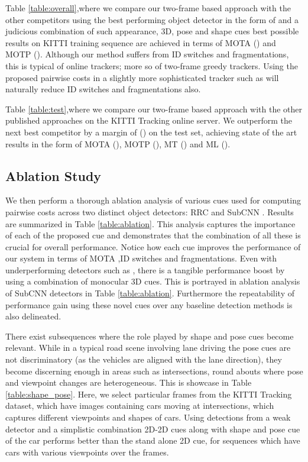 \documentclass[letterpaper, 10 pt, conference]{ieeeconf}
\begin{document}
Table \ref{table:overall},where we compare our two-frame based approach with the other competitors using the best performing object detector in the form of \cite{RRC} and a judicious combination of such appearance, 3D, pose and shape cues best possible results on KITTI training sequence are achieved in terms of MOTA () and MOTP (). Although our method suffers from ID switches and fragmentations, this is typical of online trackers; more so of two-frame greedy trackers. Using the proposed pairwise costs in a slightly more sophisticated tracker such as \cite{NOMT,followme} will naturally reduce ID switches and fragmentations also.

Table \ref{table:test},where we compare our two-frame based approach with the other published approaches on the KITTI Tracking online server. We outperform the next best competitor by a margin of () on the test set, achieving state of the art results in the form of MOTA (), MOTP (), MT () and ML ().

\subsection{Ablation Study}

We then perform a thorough ablation analysis of various cues used for computing pairwise costs across two distinct object detectors: RRC \cite{RRC} and SubCNN \cite{SubCNN}. 
Results are summarized in Table \ref{table:ablation}. This analysis captures the importance of each of the proposed cue and demonstrates that the combination of all these is crucial for overall performance. Notice how each cue improves the performance of our system in terms of MOTA ,ID switches and fragmentations. Even with underperforming detectors such as \cite{SubCNN}, there is a tangible performance boost by using a combination of monocular 3D cues. This is portrayed in ablation analysis of SubCNN detectors in Table \ref{table:ablation}. Furthermore the repeatability of performance gain using these novel cues over any baseline detection methods is also delineated.

There exist subsequences where the role played by shape and pose cues become relevant. While in a typical road scene involving lane driving the pose cues are not discriminatory (as the vehicles are aligned with the lane direction), they become discerning enough in areas such as intersections, round abouts where pose and viewpoint changes are heterogeneous. This is showcase in Table \ref{table:shape_pose}. Here, we select particular frames from the KITTI Tracking dataset, which  have images containing cars moving at intersections, which captures different viewpoints and shapes of cars. Using detections from a weak detector \cite{SubCNN} and a simplistic combination 2D-2D cues along with shape and pose cue of the car performs better than the stand alone 2D cue, for sequences which have cars with various viewpoints over the frames.
\end{document}

